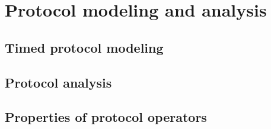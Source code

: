 
\part{Protocol modeling and analysis}


\chapter{Timed protocol modeling}
\label{chap:timed-protocols}


\chapter{Protocol analysis}
\label{chap:protocol-analysis}


\chapter{Properties of protocol operators}
\label{chap:protocol-operators}


